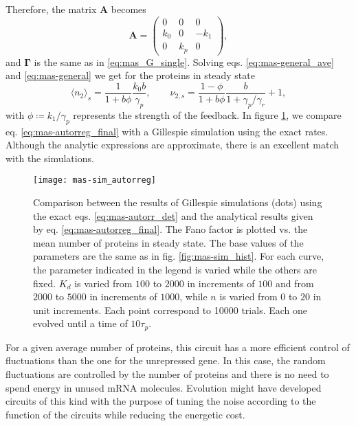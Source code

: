 Therefore, the matrix $\mathbf{A}$ becomes
\begin{equation*}
  \mathbf{A} =
  \begin{pmatrix}
    0 & 0 & 0 \\
    k_0 & 0 & -k_1 \\
    0 & k_p & 0
  \end{pmatrix},
\end{equation*}
and $\mathbf{\Gamma}$ is the same as in \eqref{eq:mas_G_single}. Solving eqs. \eqref{eq:mas-general_ave} and \eqref{eq:mas-general} we get for the proteins in steady state
\begin{equation}
  \label{eq:mas-autorreg_final}
  \langle n_2\rangle_s = \frac{1}{1+b\phi}\frac{k_0b}{\gamma_p},\quad\quad \nu_{2,s} = \frac{1-\phi}{1+b\phi}\frac{b}{1+\gamma_p/\gamma_r}+1,
\end{equation}
with $\phi\coloneqq k_1/\gamma_p$ represents the strength of the feedback. In figure \ref{fig:mas-sim_autorreg}, we compare eq. \eqref{eq:mas-autorreg_final}  with a Gillespie simulation using the exact rates. Although the analytic expressions are approximate, there is an excellent match with the simulations.
\begin{figure}[H]
  \centering
  \texttt{[image: mas-sim\_autorreg]}
  \caption[Fano factor of the number of proteins for a negatively autorregulated gene]{\label{fig:mas-sim_autorreg} Comparison between the results of Gillespie simulations (dots) using the exact eqs. \eqref{eq:mas-autorr_det} and the analytical results given by eq. \eqref{eq:mas-autorreg_final}. The Fano factor is plotted vs. the mean number of proteins in steady state. The base values of the parameters are the same as in fig. \ref{fig:mas-sim_hist}. For each curve, the parameter indicated in the legend is varied while the others are fixed. $K_d$ is varied from $100$ to $2000$ in increments of $100$ and from $2000$ to $5000$ in increments of $1000$, while $n$ is varied from $0$ to $20$ in unit increments. Each point correspond to 10000 trials. Each one evolved until a time of $10\tau_p$.}
\end{figure}
For a given average number of proteins, this circuit has a more efficient control of fluctuations than the one for the unrepressed gene. In this case, the random fluctuations are controlled by the number of proteins and there is no need to spend energy in unused mRNA molecules. Evolution might have developed circuits of this kind with the purpose of tuning the noise according to the function of the circuits while reducing the energetic cost.

